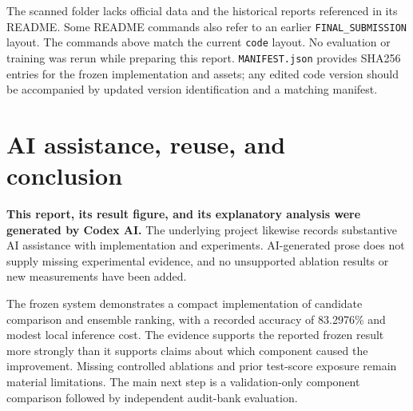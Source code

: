 \documentclass[11pt]{article}
\begin{document}
The scanned folder lacks official data and the historical reports referenced in its README. Some README commands also refer to an earlier \texttt{FINAL\_SUBMISSION} layout. The commands above match the current \texttt{code} layout. No evaluation or training was rerun while preparing this report. \texttt{MANIFEST.json} provides SHA256 entries for the frozen implementation and assets; any edited code version should be accompanied by updated version identification and a matching manifest.

\section{AI assistance, reuse, and conclusion}

\textbf{This report, its result figure, and its explanatory analysis were generated by Codex AI.} The underlying project likewise records substantive AI assistance with implementation and experiments. AI-generated prose does not supply missing experimental evidence, and no unsupported ablation results or new measurements have been added.

The frozen system demonstrates a compact implementation of candidate comparison and ensemble ranking, with a recorded accuracy of 83.2976\% and modest local inference cost. The evidence supports the reported frozen result more strongly than it supports claims about which component caused the improvement. Missing controlled ablations and prior test-score exposure remain material limitations. The main next step is a validation-only component comparison followed by independent audit-bank evaluation.
\end{document}
